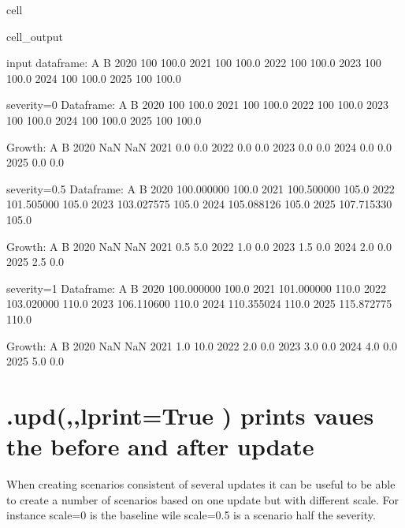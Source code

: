 \documentclass[letterpaper,10pt,english]{jupyterBook}
\begin{document}
\begin{sphinxuseclass}{cell}
\begin{sphinxVerbatimOutput}
\begin{sphinxuseclass}{cell_output}
\begin{sphinxVerbatim}[commandchars=\\\{\}]
input dataframe: 
        A      B
2020  100  100.0
2021  100  100.0
2022  100  100.0
2023  100  100.0
2024  100  100.0
2025  100  100.0


severity=0
Dataframe:
        A      B
2020  100  100.0
2021  100  100.0
2022  100  100.0
2023  100  100.0
2024  100  100.0
2025  100  100.0

Growth:
        A    B
2020  NaN  NaN
2021  0.0  0.0
2022  0.0  0.0
2023  0.0  0.0
2024  0.0  0.0
2025  0.0  0.0


severity=0.5
Dataframe:
               A      B
2020  100.000000  100.0
2021  100.500000  105.0
2022  101.505000  105.0
2023  103.027575  105.0
2024  105.088126  105.0
2025  107.715330  105.0

Growth:
        A    B
2020  NaN  NaN
2021  0.5  5.0
2022  1.0  0.0
2023  1.5  0.0
2024  2.0  0.0
2025  2.5  0.0
\end{sphinxVerbatim}

\begin{sphinxVerbatim}[commandchars=\\\{\}]
severity=1
Dataframe:
               A      B
2020  100.000000  100.0
2021  101.000000  110.0
2022  103.020000  110.0
2023  106.110600  110.0
2024  110.355024  110.0
2025  115.872775  110.0

Growth:
        A     B
2020  NaN   NaN
2021  1.0  10.0
2022  2.0   0.0
2023  3.0   0.0
2024  4.0   0.0
2025  5.0   0.0
\end{sphinxVerbatim}

\end{sphinxuseclass}\end{sphinxVerbatimOutput}

\end{sphinxuseclass}

\section{.upd(,,lprint=True ) prints vaues the before and after update}
\label{\detokenize{content/howto/update/model update:upd-lprint-true-prints-vaues-the-before-and-after-update}}
\sphinxAtStartPar
When creating scenarios consistent of several updates it can be useful to be able to create
a number of scenarios based on one update but with different scale. For instance scale=0 is the baseline wile scale=0.5 is a scenario half
the severity.
\end{document}
